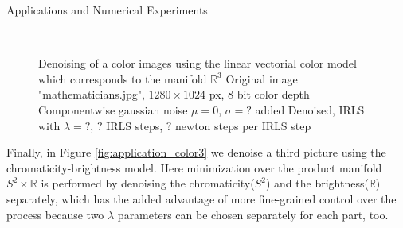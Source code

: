 \begin{chapter}{Applications and Numerical Experiments}
\begin{figure}[h!]
    \centering
    \\
    \caption[Large image "mathematicians" linear-vectorial denoising]{Denoising of a color images using the linear vectorial color model which corresponds to the manifold $\mathbb{R}^3$
	 Original image "mathematicians.jpg", $1280\times 1024$ px, 8 bit color depth
	 Componentwise gaussian noise $\mu=0$, $\sigma=?$ added
	 Denoised, IRLS with $\lambda=?$, $?$ IRLS steps, $?$ newton steps per IRLS step
	\label{fig:application_color2}
    }
\end{figure}

Finally, in Figure \ref{fig:application_color3} we denoise a third picture using the chromaticity-brightness model. Here minimization over the product manifold
$S^2\times \mathbb{R}$ is performed by denoising the chromaticity($S^2$) and the brightness($\mathbb{R}$) separately, which has the added advantage of more 
fine-grained control over the process because two $\lambda$ parameters can be chosen separately for each part, too.



\end{chapter}
